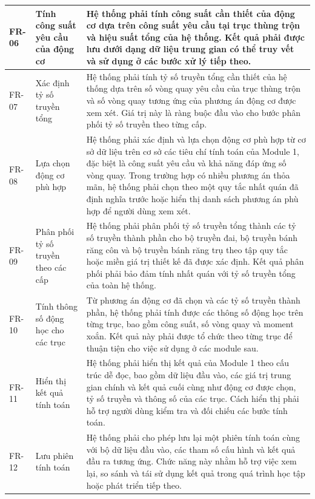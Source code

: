 \documentclass[a4paper]{article}
\begin{document}
\begin{longtable}{|>{\raggedright\arraybackslash}p{1.8cm}|>{\raggedright\arraybackslash}p{4.2cm}|>{\raggedright\arraybackslash}p{8.2cm}|}
FR-06 & Tính công suất yêu cầu của động cơ & Hệ thống phải tính công suất cần thiết của động cơ dựa trên công suất yêu cầu tại trục thùng trộn và hiệu suất tổng của hệ thống. Kết quả phải được lưu dưới dạng dữ liệu trung gian có thể truy vết và sử dụng ở các bước xử lý tiếp theo. \\ \hline

FR-07 & Xác định tỷ số truyền tổng & Hệ thống phải tính tỷ số truyền tổng cần thiết của hệ thống dựa trên số vòng quay yêu cầu của trục thùng trộn và số vòng quay tương ứng của phương án động cơ được xem xét. Giá trị này là ràng buộc đầu vào cho bước phân phối tỷ số truyền theo từng cấp. \\ \hline

FR-08 & Lựa chọn động cơ phù hợp & Hệ thống phải xác định và lựa chọn động cơ phù hợp từ cơ sở dữ liệu trên cơ sở các tiêu chí tính toán của Module 1, đặc biệt là công suất yêu cầu và khả năng đáp ứng số vòng quay. Trong trường hợp có nhiều phương án thỏa mãn, hệ thống phải chọn theo một quy tắc nhất quán đã định nghĩa trước hoặc hiển thị danh sách phương án phù hợp để người dùng xem xét. \\ \hline

FR-09 & Phân phối tỷ số truyền theo các cấp & Hệ thống phải phân phối tỷ số truyền tổng thành các tỷ số truyền thành phần cho bộ truyền đai, bộ truyền bánh răng côn và bộ truyền bánh răng trụ theo tập quy tắc hoặc miền giá trị thiết kế đã được xác định. Kết quả phân phối phải bảo đảm tính nhất quán với tỷ số truyền tổng của toàn hệ thống. \\ \hline

FR-10 & Tính thông số động học cho các trục & Từ phương án động cơ đã chọn và các tỷ số truyền thành phần, hệ thống phải tính được các thông số động học trên từng trục, bao gồm công suất, số vòng quay và moment xoắn. Kết quả này phải được tổ chức theo từng trục để thuận tiện cho việc sử dụng ở các module sau. \\ \hline

FR-11 & Hiển thị kết quả tính toán & Hệ thống phải hiển thị kết quả của Module 1 theo cấu trúc dễ đọc, bao gồm dữ liệu đầu vào, các giá trị trung gian chính và kết quả cuối cùng như động cơ được chọn, tỷ số truyền và thông số của các trục. Cách hiển thị phải hỗ trợ người dùng kiểm tra và đối chiếu các bước tính toán. \\ \hline

FR-12 & Lưu phiên tính toán & Hệ thống phải cho phép lưu lại một phiên tính toán cùng với bộ dữ liệu đầu vào, các tham số cấu hình và kết quả đầu ra tương ứng. Chức năng này nhằm hỗ trợ việc xem lại, so sánh và tái sử dụng kết quả trong quá trình học tập hoặc phát triển tiếp theo. \\ \hline


\end{longtable}
\end{document}
